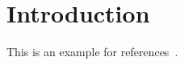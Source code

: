 \section{Introduction}
\label{sec:intro}

This is an example for references~\cite{cormen2022introduction}.

\lipsum[2]
